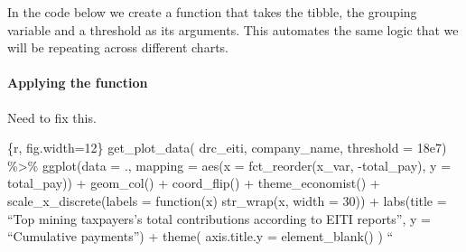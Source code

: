 \documentclass[]{article}
\newenvironment{Shaded}{\begin{snugshade}}{\end{snugshade}}
\newcommand{\ControlFlowTok}[1]{\textcolor[rgb]{0.13,0.29,0.53}{\textbf{#1}}}
\newcommand{\DataTypeTok}[1]{\textcolor[rgb]{0.13,0.29,0.53}{#1}}
\newcommand{\KeywordTok}[1]{\textcolor[rgb]{0.13,0.29,0.53}{\textbf{#1}}}
\newcommand{\NormalTok}[1]{#1}
\newcommand{\OperatorTok}[1]{\textcolor[rgb]{0.81,0.36,0.00}{\textbf{#1}}}
\newcommand{\StringTok}[1]{\textcolor[rgb]{0.31,0.60,0.02}{#1}}
\let\oldparagraph\paragraph
\renewcommand{\paragraph}[1]{\oldparagraph{#1}\mbox{}}
\begin{document}
In the code below we create a function that takes the tibble, the
grouping variable and a threshold as its arguments. This automates the
same logic that we will be repeating across different charts.

\begin{Shaded}
\end{Shaded}

\hypertarget{applying-the-function}{%
\paragraph{Applying the function}\label{applying-the-function}}

Need to fix this.

\{r, fig.width=12\} get\_plot\_data( drc\_eiti, company\_name, threshold
= 18e7) \%\textgreater{}\% ggplot(data = ., mapping = aes(x =
fct\_reorder(x\_var, -total\_pay), y = total\_pay)) + geom\_col() +
coord\_flip() + theme\_economist() + scale\_x\_discrete(labels =
function(x) str\_wrap(x, width = 30)) + labs(title = ``Top mining
taxpayers's total contributions according to EITI reports'', y =
``Cumulative payments'') + theme( axis.title.y = element\_blank() ) ``
\end{document}
